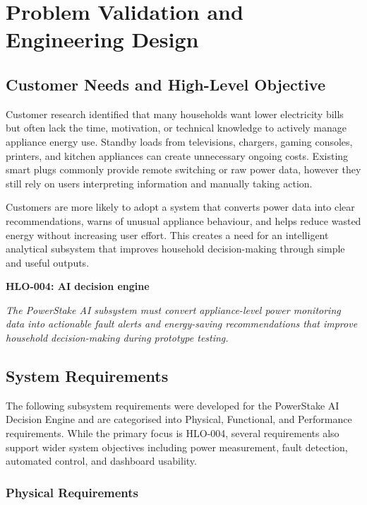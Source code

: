 \documentclass[11pt, twoside, a4paper]{article}
\begin{document}
\section{Problem Validation and Engineering Design}

\subsection{Customer Needs and High-Level Objective}

Customer research identified that many households want lower electricity bills but often lack the time, motivation, or technical knowledge to actively manage 
appliance energy use. Standby loads from televisions, chargers, gaming consoles, printers, and kitchen appliances can create unnecessary ongoing costs. Existing 
smart plugs commonly provide remote switching or raw power data, however they still rely on users interpreting information and manually taking action.

Customers are more likely to adopt a system that converts power data into clear recommendations, warns of unusual appliance behaviour, and helps reduce wasted 
energy without increasing user effort. This creates a need for an intelligent analytical subsystem that improves household decision-making through simple and 
useful outputs.

\textbf{HLO-004: AI decision engine}

\textit{The PowerStake AI subsystem must convert appliance-level power monitoring data into actionable fault alerts and energy-saving recommendations that improve 
household decision-making during prototype testing.}

\vspace{0.5em}
\subsection{System Requirements}

The following subsystem requirements were developed for the PowerStake AI Decision Engine and are categorised into Physical, Functional, 
and Performance requirements. While the primary focus is HLO-004, several requirements also support wider system objectives including power 
measurement, fault detection, automated control, and dashboard usability.

\subsubsection*{Physical Requirements}
\end{document}
